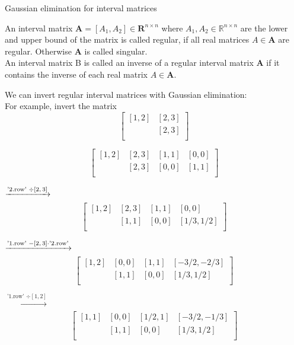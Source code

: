 \documentclass[german,10pt,xcolor=colortbl,compress, handout]{beamer}
\begin{document}
\begin{frame}{Gaussian elimination for interval matrices}
	\begin{definition}
	An interval matrix $\mathbf{A}=[A_1,A_2] \in \mathbf{R}^{n \times n} $ where $A_1, A_2 \in \mathbb{R}^{n\times n}$ are the lower and upper bound of the matrix is called regular, if all real matrices $A \in \mathbf{A}$ are regular. Otherwise $\mathbf{A} $ is called singular.\\
	An interval matrix B is called an inverse of a regular interval matrix $\mathbf{A} $ if it contains the inverse of each real matrix $A \in \mathbf{A}$.
	
	\end{definition}
	\pause
	We can invert regular interval matrices with Gaussian elimination:\\
	For example, invert the matrix
	\[
	\left[
	\begin{array}{cc}
	[1,2]&[2,3] \\
	
	[0,0]&[2,3]\\
	\end{array}
	\right]
	\]

\end{frame}

\begin{frame}
\[
	\left[
	\begin{array}{cc|cc}
	[1,2]&[2,3]&[1,1]&[0,0]  \\
	
	[0,0]&[2,3]&[0,0]&[1,1]  \\
	\end{array}
	\right]
	\]
	
	\pause
	
	$\xrightarrow[\text{}]{\text{'2.row' $ \div  [2,3]$}}$
	\[
	\left[
	\begin{array}{cc|cc}
	[1,2]&[2,3]&[1,1]&[0,0]  \\
	
	[0,0]&[1,1]&[0,0]&[1/3,1/2]  \\
	\end{array}
	\right]
	\]

	\pause
	
	$\xrightarrow[\text{}]{\text{'1.row' $ - [2,3]\cdot$'2.row'}}$
	\[
	\left[
	\begin{array}{cc|cc}
	[1,2]&[0,0]&[1,1]&[-3/2,-2/3]  \\
	
	[0,0]&[1,1]&[0,0]&[1/3,1/2]  \\
	\end{array}
	\right]
	\]
	
	\pause
	
	$\xrightarrow[\text{}]{\text{'1.row' $\div  [1,2]$}}$
	\[
	\left[
	\begin{array}{cc|cc}
	[1,1]&[0,0]&[1/2,1]&[-3/2,-1/3]  \\
	
	[0,0]&[1,1]&[0,0]&[1/3,1/2]  \\
	\end{array}
	\right]
	\]


\end{frame}
\end{document}
